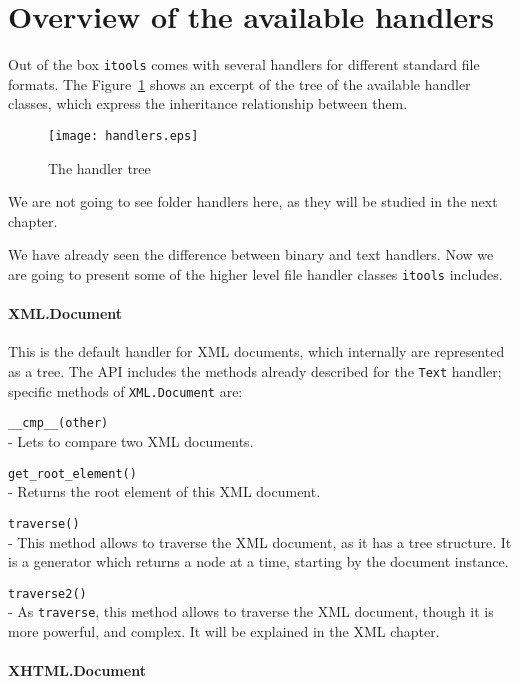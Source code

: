 \section{Overview of the available handlers}

Out of the box {\tt itools} comes with several handlers for different
standard file formats. The Figure~\ref{Figure: handler tree} shows an
excerpt of the tree of the available handler classes, which express the
inheritance relationship between them.

\begin{figure}
  \center
  \texttt{[image: handlers.eps]}
  \caption{The handler tree}
  \label{Figure: handler tree}
\end{figure}

We are not going to see folder handlers here, as they will be studied in
the next chapter.

We have already seen the difference between binary and text handlers. Now
we are going to present some of the higher level file handler classes
{\tt itools} includes.


\paragraph{XML.Document}

This is the default handler for XML documents, which internally are
represented as a tree. The API includes the methods already described
for the {\tt Text} handler; specific methods of {\tt XML.Document} are:

\begin{api}
  {\tt \_\_cmp\_\_(other)}\\
  - Lets to compare two XML documents.

  {\tt get\_root\_element()}\\
  - Returns the root element of this XML document.

  {\tt traverse()}\\
  - This method allows to traverse the XML document, as it has a tree
    structure. It is a generator which returns a node at a time, starting
    by the document instance.

  {\tt traverse2()}\\
  - As {\tt traverse}, this method allows to traverse the XML document,
    though it is more powerful, and complex. It will be explained in the
    XML chapter.
\end{api}

\paragraph{XHTML.Document}

